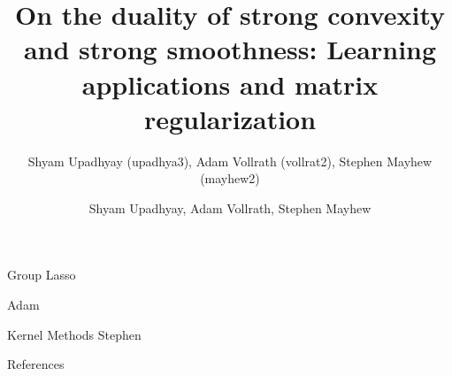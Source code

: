 \documentclass[11pt]{beamer}
\author{Shyam Upadhyay (upadhya3), Adam Vollrath (vollrat2), Stephen Mayhew (mayhew2)}
\title{On the duality of strong convexity and strong smoothness: Learning applications and matrix regularization}
\date{Shyam Upadhyay, Adam Vollrath, Stephen Mayhew}
\begin{document}
{\nologo
\begin{frame}
\titlepage
\end{frame}
}




\begin{frame}{Group Lasso}

Adam

\end{frame}

\begin{frame}{Kernel Methods}
Stephen

\end{frame}

\begin{frame}[allowframebreaks]{References}
  \def\newblock{}
  
  
\end{frame}
\end{document}
